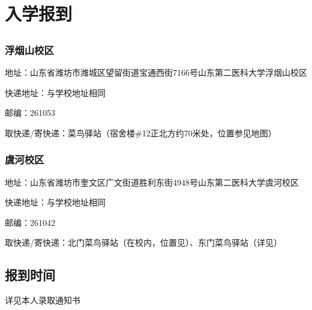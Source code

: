 \section[入学报到]{入学报到}

\subsection[地址与快递]{}
\subsubsection[浮烟山校区]{浮烟山校区}
地址：山东省潍坊市潍城区望留街道宝通西街7166号山东第二医科大学浮烟山校区

快递地址：与学校地址相同

邮编：261053

取快递/寄快递：菜鸟驿站（宿舍楼\#12正北方约70米处，位置参见地图）\footnotemark
{}

\subsubsection[虞河校区]{虞河校区}
地址：山东省潍坊市奎文区广文街道胜利东街4948号山东第二医科大学虞河校区

快递地址：与学校地址相同

邮编：261042

取快递/寄快递：北门菜鸟驿站（在校内，位置见）、东门菜鸟驿站（详见）\footnotemark
{}

\subsection[报到时间]{报到时间}
详见本人录取通知书

